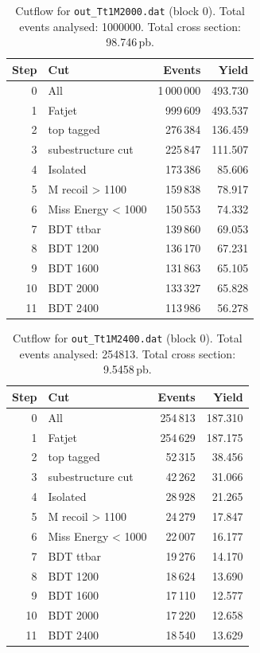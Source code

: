 \documentclass{article}
\begin{document}
\begin{table}[H]
\centering
\begin{tabular}{r l r r}
\toprule
Step & Cut & Events & Yield \\
\midrule
0 & All & 1\,000\,000 & 493.730 \\
1 & Fatjet & 999\,609 & 493.537 \\
2 & top tagged & 276\,384 & 136.459 \\
3 & subestructure cut & 225\,847 & 111.507 \\
4 & Isolated & 173\,386 & 85.606 \\
5 & M recoil > 1100 & 159\,838 & 78.917 \\
6 & Miss Energy < 1000 & 150\,553 & 74.332 \\
7 & BDT ttbar & 139\,860 & 69.053 \\
8 & BDT 1200 & 136\,170 & 67.231 \\
9 & BDT 1600 & 131\,863 & 65.105 \\
10 & BDT 2000 & 133\,327 & 65.828 \\
11 & BDT 2400 & 113\,986 & 56.278 \\
\bottomrule
\end{tabular}
\caption{Cutflow for \texttt{out\_Tt1M2000.dat} (block 0). Total events analysed: 1000000. Total cross section: 98.746\,pb.}
\label{tab:cutflow-out-Tt1M2000-dat}
\end{table}

\begin{table}[H]
\centering
\begin{tabular}{r l r r}
\toprule
Step & Cut & Events & Yield \\
\midrule
0 & All & 254\,813 & 187.310 \\
1 & Fatjet & 254\,629 & 187.175 \\
2 & top tagged & 52\,315 & 38.456 \\
3 & subestructure cut & 42\,262 & 31.066 \\
4 & Isolated & 28\,928 & 21.265 \\
5 & M recoil > 1100 & 24\,279 & 17.847 \\
6 & Miss Energy < 1000 & 22\,007 & 16.177 \\
7 & BDT ttbar & 19\,276 & 14.170 \\
8 & BDT 1200 & 18\,624 & 13.690 \\
9 & BDT 1600 & 17\,110 & 12.577 \\
10 & BDT 2000 & 17\,220 & 12.658 \\
11 & BDT 2400 & 18\,540 & 13.629 \\
\bottomrule
\end{tabular}
\caption{Cutflow for \texttt{out\_Tt1M2400.dat} (block 0). Total events analysed: 254813. Total cross section: 9.5458\,pb.}
\label{tab:cutflow-out-Tt1M2400-dat}
\end{table}
\end{document}
